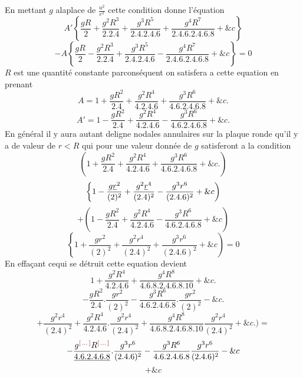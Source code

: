 \documentclass[11pt,a4paper]{article}
\begin{document}

En mettant $g$ alaplace de $\frac{u^2}{e^2}$ cette condition donne l'équation
\[ A'\left\{\frac{gR}{2} + \frac{g^2R^3}{2.2.4} + \frac{g^3R^5}{2.4.2.4.6} + \frac{g^4R^7}{2.4.6.2.4.6.8} + \&c\right\} \]
\[ -A\left\{\frac{gR}{2} - \frac{g^2R^3}{2.2.4} + \frac{g^3R^5}{2.4.2.4.6} - \frac{g^4R^7}{2.4.6.2.4.6.8} + \&c\right\} = 0 \]
$R$ est une quantité constante parconséquent on satisfera
a cette equation en prenant
\[ A = 1 + \frac{gR^2}{2.4} + \frac{g^2R^4}{4.2.4.6} + \frac{g^3R^6}{4.6.2.4.6.8} + \&c. \]
\[ A' = 1 - \frac{gR^2}{2.4} + \frac{g^2R^4}{4.2.4.6} - \frac{g^3R^6}{4.6.2.4.6.8} + \&c. \]
En général il y aura autant deligne nodales annulaires
sur la plaque ronde qu'il y a de valeur de $r < R$
qui pour une valeur donnée de $g$ satisferont a la condition
\[ \left(1 + \frac{gR^2}{2.4} + \frac{g^2R^4}{4.2.4.6} + \frac{g^3R^6}{4.6.2.4.6.8} + \&c.\right) \]
\[ \left\{1 - \frac{g\uncertain{r}^2}{(2)^2} + \frac{g^2\uncertain{r}^4}{(2.4)^2} - \frac{g^3r^6}{(2.4.6)^2} + \&c\right) \]
\[ +\left(1 - \frac{gR^2}{2.4} + \frac{g^2R^4}{4.2.4.6} - \frac{g^3R^6}{4.6.2.4.6.8} + \&c\right) \]
\[ \left\{1 + \frac{gr^2}{(2)^2} + \frac{g^2r^4}{(2.4)^2} + \frac{g^3r^6}{(2.4.6)^2} + \&c\right) = 0 \]
En effaçant cequi se détruit cette equation  devient
\[ 1 + \frac{g^2R^4}{4.2.4.6} + \frac{g^4R^8}{4.6.8.2.4.6.8.10} + \&c. \]
\[ -\frac{gR^2}{2.4}.\frac{gr^2}{(2)^2} - \frac{g^3R^6}{4.6.2.4.6.8}.\frac{gr^2}{(2)^2} - \&c. \]
\[ +\frac{g^2r^4}{(2.4)^2} + \frac{g^2R^4}{4.2.4.6}.\frac{g^2r^4}{(2.4)^2} + \frac{g^4R^8}{4.6.8.2.4.6.8.10}\frac{g^2r^4}{(2.4)^2} + \&c.\Big) = \]
\[ -\frac{g^{\ill{}}R^{\ill{}}}{\uncertain{4.6.2.4.6.8}}.\frac{g^3r^6}{(2.4.6)^2} - \frac{g^3R^6}{4.6.2.4.6.8}\frac{g^3r^6}{(2.4.6)^2} - \&c \]
\[ + \&c \]
\end{document}
